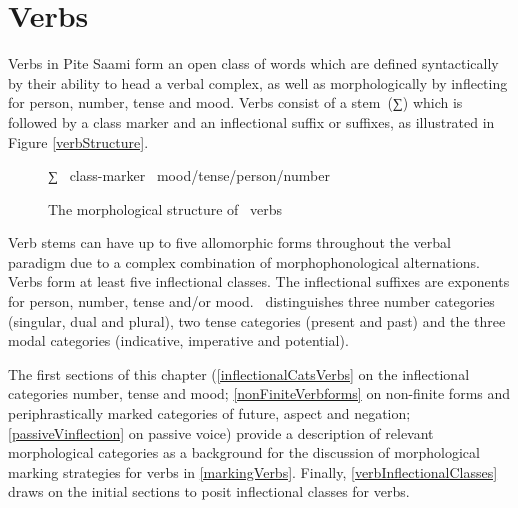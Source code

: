 

\chapter{Verbs}\label{verbs}
Verbs in Pite Saami form an open class of words which are defined syntactically by their ability to head a verbal complex, as well as morphologically by inflecting for person, number, tense and mood. 
Verbs consist of a \mbox{stem (∑)} which is followed by a class marker and an inflectional suffix or suffixes, %
as illustrated in Figure \vref{verbStructure}. %

\begin{figure}[h]\centering
∑ \PLUS\ class-marker \PLUS\ mood/tense/person/number%
\caption{The morphological structure of \PS\ verbs}\label{verbStructure}
\end{figure}

Verb stems can have up to five allomorphic forms throughout the verbal para\-digm due to a complex combination of morphophonological alternations. 
Verbs form at least five inflectional classes. 
The inflectional suffixes are exponents for person, number, tense and/or mood. 
\PS\ distinguishes three number categories (singular, dual and plural), two tense categories (present and past) and the three modal categories (indicative, imperative and potential). 


The first sections of this chapter (\SEC\ref{inflectionalCatsVerbs} on the inflectional categories number, tense and mood; \SEC\ref{nonFiniteVerbforms} on non-finite forms and periphrastically marked categories of future, aspect and negation; \SEC\ref{passiveVinflection} on passive voice) provide a description of relevant morphological categories as a background for the discussion of morphological marking strategies for verbs in \SEC\ref{markingVerbs}. Finally, \SEC\ref{verbInflectionalClasses} draws on the initial sections to posit inflectional classes for verbs. 


